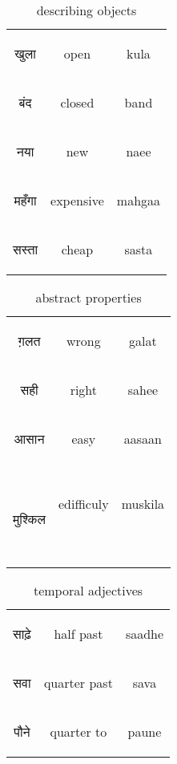 \begin{table}[H]
    \centering
    \begin{tabular}{c|c|c}
        \begin{hindi} खुला \end{hindi} & open & kula \\
        \begin{hindi} बंद \end{hindi} & closed & band \\
        \begin{hindi} नया \end{hindi} & new & naee \\
        \begin{hindi} महँगा \end{hindi} & expensive & mahgaa \\
        \begin{hindi} सस्ता \end{hindi} & cheap & sasta \\
    \end{tabular}
    \caption{describing objects}
    \label{tab:adjectives_object_describing}
\end{table}

\begin{table}[H]
    \centering
    \begin{tabular}{c|c|c}
        \begin{hindi} ग़लत \end{hindi} & wrong & galat \\
        \begin{hindi} सही \end{hindi} & right & sahee \\
        \begin{hindi} आसान \end{hindi} &  easy & aasaan \\\
        \begin{hindi}मुश्किल \end{hindi} &  edifficuly & muskila \\\
    \end{tabular}
    \caption{abstract properties}
    \label{tab:adjectives_abstract}
\end{table}

\begin{table}[H]
    \centering
    \begin{tabular}{c|c|c}
        \begin{hindi} साढ़े \end{hindi} & half past  & saadhe \\
        \begin{hindi} सवा \end{hindi} & quarter past  & sava \\
        \begin{hindi} पौने \end{hindi} & quarter to  & paune \\
    \end{tabular}
    \caption{temporal adjectives}
    \label{tab:adjectives_temporal}
\end{table}

